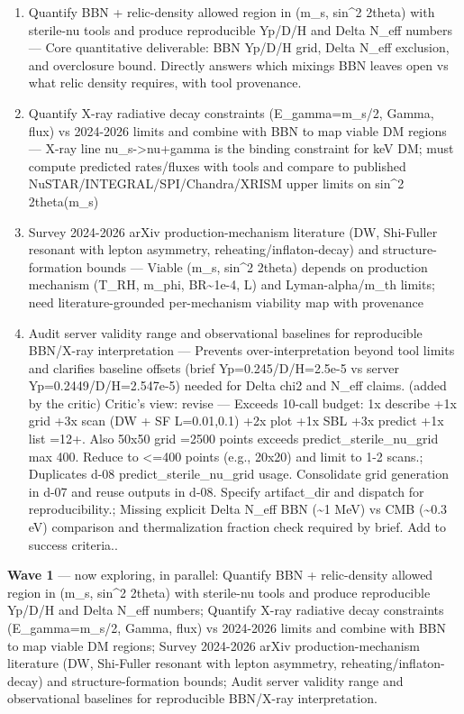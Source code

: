\documentclass[11pt,a4paper]{article}
\begin{document}
\begin{enumerate}
  \item Quantify BBN + relic-density allowed region in (m\_s, sin\textasciicircum{}2 2theta) with sterile-nu tools and produce reproducible Yp/D/H and Delta N\_eff numbers --- Core quantitative deliverable: BBN Yp/D/H grid, Delta N\_eff exclusion, and overclosure bound. Directly answers which mixings BBN leaves open vs what relic density requires, with tool provenance.
  \item Quantify X-ray radiative decay constraints (E\_gamma=m\_s/2, Gamma, flux) vs 2024-2026 limits and combine with BBN to map viable DM regions --- X-ray line nu\_s-\textgreater{}nu+gamma is the binding constraint for keV DM; must compute predicted rates/fluxes with tools and compare to published NuSTAR/INTEGRAL/SPI/Chandra/XRISM upper limits on sin\textasciicircum{}2 2theta(m\_s)
  \item Survey 2024-2026 arXiv production-mechanism literature (DW, Shi-Fuller resonant with lepton asymmetry, reheating/inflaton-decay) and structure-formation bounds --- Viable (m\_s, sin\textasciicircum{}2 2theta) depends on production mechanism (T\_RH, m\_phi, BR\textasciitilde{}1e-4, L) and Lyman-alpha/m\_th limits; need literature-grounded per-mechanism viability map with provenance
  \item Audit server validity range and observational baselines for reproducible BBN/X-ray interpretation --- Prevents over-interpretation beyond tool limits and clarifies baseline offsets (brief Yp=0.245/D/H=2.5e-5 vs server Yp=0.2449/D/H=2.547e-5) needed for Delta chi2 and N\_eff claims. (added by the critic)
Critic's view: revise --- Exceeds 10-call budget: 1x describe +1x grid +3x scan (DW + SF L=0.01,0.1) +2x plot +1x SBL +3x predict +1x list =12+. Also 50x50 grid =2500 points exceeds predict\_sterile\_nu\_grid max 400. Reduce to \textless{}=400 points (e.g., 20x20) and limit to 1-2 scans.; Duplicates d-08 predict\_sterile\_nu\_grid usage. Consolidate grid generation in d-07 and reuse outputs in d-08. Specify artifact\_dir and dispatch for reproducibility.; Missing explicit Delta N\_eff BBN (\textasciitilde{}1 MeV) vs CMB (\textasciitilde{}0.3 eV) comparison and thermalization fraction check required by brief. Add to success criteria..

\end{enumerate}
\textbf{Wave 1} --- now exploring, in parallel: Quantify BBN + relic-density allowed region in (m\_s, sin\textasciicircum{}2 2theta) with sterile-nu tools and produce reproducible Yp/D/H and Delta N\_eff numbers; Quantify X-ray radiative decay constraints (E\_gamma=m\_s/2, Gamma, flux) vs 2024-2026 limits and combine with BBN to map viable DM regions; Survey 2024-2026 arXiv production-mechanism literature (DW, Shi-Fuller resonant with lepton asymmetry, reheating/inflaton-decay) and structure-formation bounds; Audit server validity range and observational baselines for reproducible BBN/X-ray interpretation.
\end{document}
